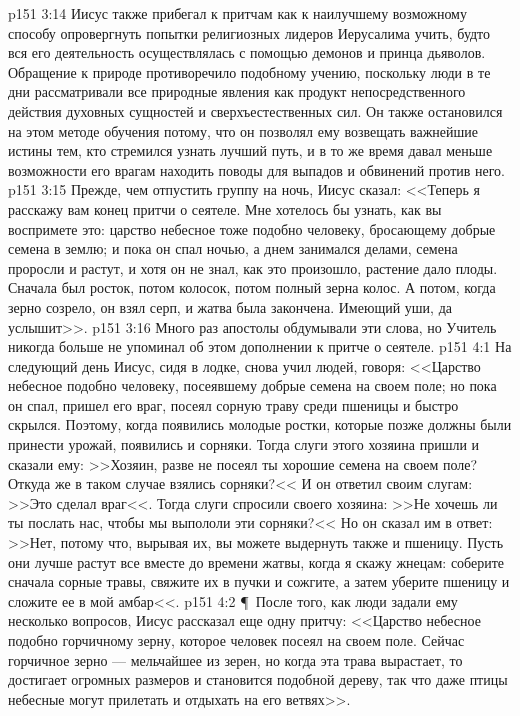 \vs p151 3:14 Иисус также прибегал к притчам как к наилучшему возможному способу опровергнуть попытки религиозных лидеров Иерусалима учить, будто вся его деятельность осуществлялась с помощью демонов и принца дьяволов. Обращение к природе противоречило подобному учению, поскольку люди в те дни рассматривали все природные явления как продукт непосредственного действия духовных сущностей и сверхъестественных сил. Он также остановился на этом методе обучения потому, что он позволял ему возвещать важнейшие истины тем, кто стремился узнать лучший путь, и в то же время давал меньше возможности его врагам находить поводы для выпадов и обвинений против него.
\vs p151 3:15 Прежде, чем отпустить группу на ночь, Иисус сказал: <<Теперь я расскажу вам конец притчи о сеятеле. Мне хотелось бы узнать, как вы воспримете это: царство небесное тоже подобно человеку, бросающему добрые семена в землю; и пока он спал ночью, а днем занимался делами, семена проросли и растут, и хотя он не знал, как это произошло, растение дало плоды. Сначала был росток, потом колосок, потом полный зерна колос. А потом, когда зерно созрело, он взял серп, и жатва была закончена. Имеющий уши, да услышит>>.
\vs p151 3:16 Много раз апостолы обдумывали эти слова, но Учитель никогда больше не упоминал об этом дополнении к притче о сеятеле.
\vs p151 4:1 На следующий день Иисус, сидя в лодке, снова учил людей, говоря: <<Царство небесное подобно человеку, посеявшему добрые семена на своем поле; но пока он спал, пришел его враг, посеял сорную траву среди пшеницы и быстро скрылся. Поэтому, когда появились молодые ростки, которые позже должны были принести урожай, появились и сорняки. Тогда слуги этого хозяина пришли и сказали ему: >>Хозяин, разве не посеял ты хорошие семена на своем поле? Откуда же в таком случае взялись сорняки?<< И он ответил своим слугам: >>Это сделал враг<<. Тогда слуги спросили своего хозяина: >>Не хочешь ли ты послать нас, чтобы мы выпололи эти сорняки?<< Но он сказал им в ответ: >>Нет, потому что, вырывая их, вы можете выдернуть также и пшеницу. Пусть они лучше растут все вместе до времени жатвы, когда я скажу жнецам: соберите сначала сорные травы, свяжите их в пучки и сожгите, а затем уберите пшеницу и сложите ее в мой амбар<<.
\vs p151 4:2 \P\ После того, как люди задали ему несколько вопросов, Иисус рассказал еще одну притчу: <<Царство небесное подобно горчичному зерну, которое человек посеял на своем поле. Сейчас горчичное зерно --- мельчайшее из зерен, но когда эта трава вырастает, то достигает огромных размеров и становится подобной дереву, так что даже птицы небесные могут прилетать и отдыхать на его ветвях>>.
